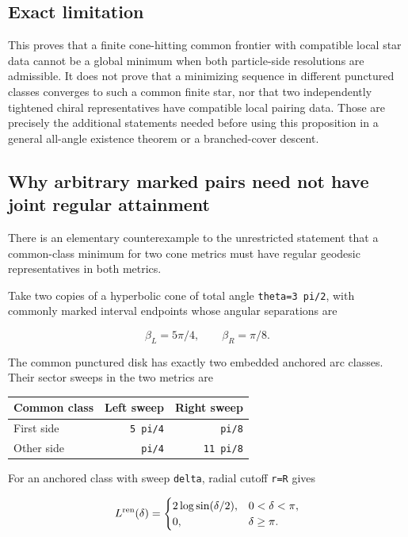 \documentclass[11pt]{article}
\begin{document}
\subsection{Exact limitation}\label{exact-limitation}

This proves that a finite cone-hitting common frontier with compatible
local star data cannot be a global minimum when both particle-side
resolutions are admissible. It does not prove that a minimizing sequence
in different punctured classes converges to such a common finite star,
nor that two independently tightened chiral representatives have
compatible local pairing data. Those are precisely the additional
statements needed before using this proposition in a general all-angle
existence theorem or a branched-cover descent.

\subsection{Why arbitrary marked pairs need not have joint regular
attainment}\label{why-arbitrary-marked-pairs-need-not-have-joint-regular-attainment}

There is an elementary counterexample to the unrestricted statement that
a common-class minimum for two cone metrics must have regular geodesic
representatives in both metrics.

Take two copies of a hyperbolic cone of total angle
\texttt{theta=3\ pi/2}, with commonly marked interval endpoints whose
angular separations are

\[
\beta_L=5\pi/4,\qquad \beta_R=\pi/8.
\]

The common punctured disk has exactly two embedded anchored arc classes.
Their sector sweeps in the two metrics are

\begin{longtable}[]{@{}lrr@{}}
\toprule\noalign{}
Common class & Left sweep & Right sweep \\
\midrule\noalign{}
\endhead
\bottomrule\noalign{}
\endlastfoot
First side & \texttt{5\ pi/4} & \texttt{pi/8} \\
Other side & \texttt{pi/4} & \texttt{11\ pi/8} \\
\end{longtable}

For an anchored class with sweep \texttt{delta}, radial cutoff
\texttt{r=R} gives

\[
L^{\rm ren}(\delta)=
\begin{cases}
2\log\sin(\delta/2),&0<\delta<\pi,\\
0,&\delta\ge\pi.
\end{cases}
\]
\end{document}
